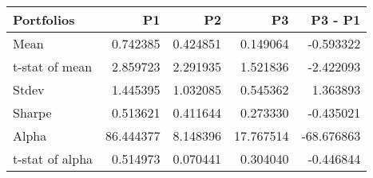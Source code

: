 \begin{tabular}{lrrrr}
\toprule
Portfolios & P1 & P2 & P3 & P3 - P1 \\
\midrule
Mean & 0.742385 & 0.424851 & 0.149064 & -0.593322 \\
t-stat of mean & 2.859723 & 2.291935 & 1.521836 & -2.422093 \\
Stdev & 1.445395 & 1.032085 & 0.545362 & 1.363893 \\
Sharpe & 0.513621 & 0.411644 & 0.273330 & -0.435021 \\
Alpha & 86.444377 & 8.148396 & 17.767514 & -68.676863 \\
t-stat of alpha & 0.514973 & 0.070441 & 0.304040 & -0.446844 \\
\bottomrule
\end{tabular}
